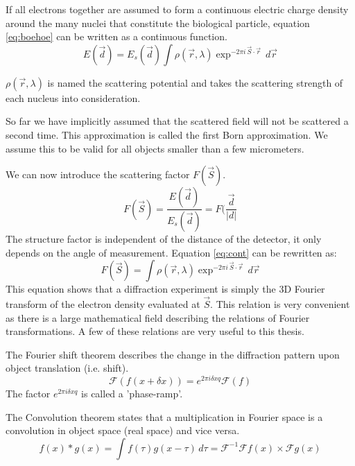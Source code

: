 If all electrons together are assumed to form a continuous electric charge density around the many nuclei that constitute the biological particle, equation \ref{eq:boehoe}  can be written as a continuous function. 
\begin{equation}\label{eq:cont}
E(\vec{d}) = E_s(\vec{d})\int \rho(\vec{r},\lambda) \exp^{-2\pi i \,\vec{S} \cdot \vec{r}}\,d\vec{r}
\end{equation}

$\rho(\vec{r},\lambda)$ is named the scattering potential and takes the scattering strength of each nucleus into consideration. 

So far we have implicitly assumed that the scattered field will not be scattered a second time. This approximation is called the first Born approximation. We assume this to be valid for all objects smaller than a few micrometers.

We can now introduce the scattering factor $F(\vec{S})$.
\begin{equation}
F(\vec{S}) = \frac{E(\vec{d})}{E_s(\vec{d})} = F(\frac{\vec{d}}{|d|}
\end{equation}
The structure factor is independent of the distance of the detector, it only depends on the angle of measurement. Equation \ref{eq:cont} can be rewritten as:
\begin{equation}\label{eq:diff_equation}
F(\vec{S}) = \int \rho(\vec{r},\lambda) \exp^{-2\pi i \,\vec{S} \cdot \vec{r}}\,d\vec{r}
\end{equation}
This equation shows that a diffraction experiment is simply the 3D Fourier transform of the electron density evaluated at $\vec{S}$. This relation is very convenient as there is a large mathematical field describing the relations of Fourier transformations. A few of these relations are very useful to this thesis.

The Fourier shift theorem describes the change in the diffraction pattern upon object translation (i.e. shift).
\begin{equation}
\mathcal{F}(f(x+\delta x))=e^{2\pi i \delta x q} \mathcal{F}(f)
\end{equation}
The factor $e^{2 \pi i \delta x q}$ is called a 'phase-ramp'.

The Convolution theorem states that a multiplication in Fourier space is a convolution in object space (real space) and vice versa.
\begin{equation}
f(x) * g(x) = \int f(\tau)g(x-\tau)\,d\tau = \mathcal{F}^{-1} {\mathcal{F}f(x)\times\mathcal{F}g(x)}
\end{equation}

